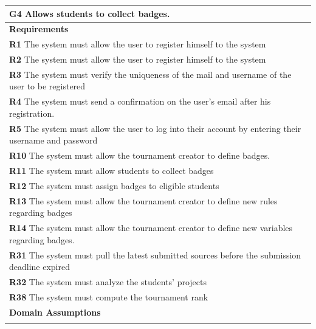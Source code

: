 \begin{table}[H]
    \begin{tabularx}{\textwidth}{X}
        \toprule
        \textbf{G4} Allows students to collect badges.                                                 \\ \midrule
        \textbf{Requirements}                                                                                                        \\ \midrule
        \textbf{R1} The system must allow the user to register himself to the system                                                  \\
        \textbf{R2} The system must allow the user to register himself to the system                                               \\ 
        \textbf{R3} The system must verify the uniqueness of the mail and username of the user to be registered                                        \\ 
        \textbf{R4} The system must send a confirmation on the user's email after his registration.                         \\ 
        \textbf{R5} The system must allow the user to log into their account by entering their username and password           \\ 
        \textbf{R10} The system must allow the tournament creator to define badges.      \\ 
        \textbf{R11} The system must allow students to collect badges        \\ 
        \textbf{R12} The system must assign badges to eligible students          \\  
        \textbf{R13} The system must allow the tournament creator to define new rules regarding badges  \\  
        \textbf{R14} The system must allow the tournament creator to define new variables regarding badges.         \\ 
        \textbf{R31} The system must pull the latest submitted sources before the submission deadline expired     \\ 
        \textbf{R32} The system must analyze the students' projects      \\ 
        \textbf{R38} The system must compute the tournament rank                 \\ 
        \midrule


        \textbf{Domain Assumptions}                                                                                                  \\ \midrule
                                                      \\ \bottomrule
    \end{tabularx}
\end{table}

